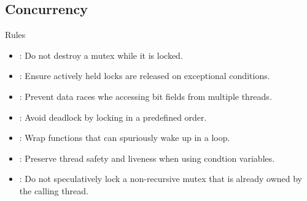 \subsection{Concurrency}

\begin{frame}[t]{Rules}
\begin{itemize}
  \item {}: 
        Do not destroy a mutex while it is locked.
  \vfill
  \item {}: 
        Ensure actively held locks are released on exceptional conditions.
  \vfill
  \item {}: 
        Prevent data races whe accessing bit fields from multiple threads.
  \vfill
  \item {}: 
        Avoid deadlock by locking in a predefined order.
  \vfill
  \item {}: 
        Wrap functions that can spuriously wake up in a loop.
  \vfill
  \item {}: 
        Preserve thread safety and liveness when using condtion variables.
  \vfill
  \item {}: 
        Do not speculatively lock a non-recursive mutex that is already owned by the calling thread.
\end{itemize}
\end{frame}


